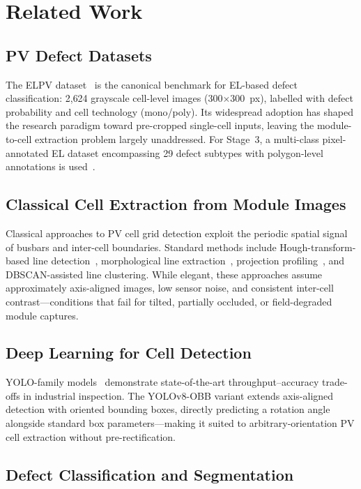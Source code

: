 \documentclass[conference]{IEEEtran}
\begin{document}
\section{Related Work}

\subsection{PV Defect Datasets}

The ELPV dataset~\cite{deitsch2019} is the canonical benchmark
for EL-based defect classification: 2{,}624 grayscale
cell-level images (300$\times$300~px), labelled with defect
probability and cell technology (mono/poly). Its widespread
adoption has shaped the research paradigm toward pre-cropped
single-cell inputs, leaving the module-to-cell extraction
problem largely unaddressed.
For Stage~3, a multi-class pixel-annotated EL dataset
encompassing 29 defect subtypes with polygon-level
annotations is used~\cite{dataset_tbd}.

\subsection{Classical Cell Extraction from Module Images}

Classical approaches to PV cell grid detection exploit the
periodic spatial signal of busbars and inter-cell boundaries.
Standard methods include Hough-transform-based line
detection~\cite{hough_lines}, morphological line
extraction~\cite{morph_lines}, projection
profiling~\cite{projection_profiles}, and
DBSCAN-assisted line clustering.
While elegant, these approaches assume approximately
axis-aligned images, low sensor noise, and consistent
inter-cell contrast---conditions that fail for tilted,
partially occluded, or field-degraded module captures.

\subsection{Deep Learning for Cell Detection}

YOLO-family models~\cite{redmon2016,jocher2023} demonstrate
state-of-the-art throughput--accuracy trade-offs in
industrial inspection.
The YOLOv8-OBB variant extends axis-aligned detection with
oriented bounding boxes, directly predicting a rotation angle
alongside standard box parameters---making it suited to
arbitrary-orientation PV cell extraction without
pre-rectification.

\subsection{Defect Classification and Segmentation}
\end{document}
